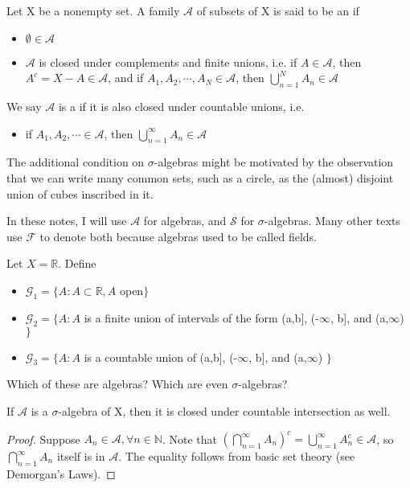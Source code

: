 \documentclass[11pt]{scrartcl}
\begin{document}
\begin{definition}
Let X be a nonempty set. A family $\mathscr{A}$ of subsets of X is said to be an  if \begin{itemize}
\item $\emptyset \in \mathscr{A}$
\item $\mathscr{A}$ is closed under complements and finite unions, i.e. if $A \in \mathscr{A}$, then $A^c = X-A \in \mathscr{A}$, and if $A_1, A_2, \cdots, A_N \in \mathscr{A}$, then $\bigcup_{n=1}^{N} A_n \in \mathscr{A}$
\end{itemize}
We say $\mathscr{A}$ is a  if  it is also closed under countable unions, i.e.
\begin{itemize}
\item if $A_1, A_2, \cdots \in \mathscr{A}$, then $\bigcup_{n=1}^{\infty} A_n \in \mathscr{A}$
\end{itemize}
\end{definition}

The additional condition on $\sigma$-algebras might be motivated by the observation that we can write many common sets, such as a circle, as the (almost) disjoint union of cubes inscribed in it.

\begin{remark}
In these notes, I will use $\mathcal{A}$ for algebras, and $\mathcal{S}$ for $\sigma$-algebras. Many other texts use $\mathscr{F}$ to denote both because algebras used to be called fields.
\end{remark}

\begin{exercise}
Let $X = \mathbb{R}$. Define \begin{itemize}
\item $\mathcal{G}_1 = \{A:A\subset\mathbb{R},A$ open$\}$
\item $\mathcal{G}_2 = \{A: A $ is a finite union of intervals of the form (a,b], (-$\infty$, b], and (a,$\infty$) $\}$
\item $\mathcal{G}_3 = \{A: A $ is a countable union of (a,b], (-$\infty$, b], and (a,$\infty$) $\}$
\end{itemize}
Which of these are algebras? Which are even $\sigma$-algebras?
\end{exercise}


\begin{remark}
If $\mathcal{A}$ is a $\sigma$-algebra of X, then it is closed under countable intersection as well.
\end{remark}
\begin{proof}
Suppose $A_n \in \mathcal{A},  \forall n \in \mathbb{N}$. Note that 
$(\bigcap_ {n=1}^{\infty} A_n)^c = \bigcup_{n=1}^{\infty} A_n^c \in \mathscr{A}$, so $\bigcap_ {n=1}^{\infty} A_n$ itself is in $\mathcal{A}$. The equality follows from basic set theory (see Demorgan's Laws).
\end{proof}
\end{document}
